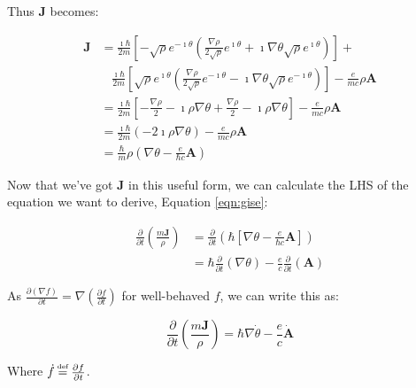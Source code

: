 Thus $\mathbf{J}$ becomes:

\begin{align}
    \mathbf{J} &= \frac{\imath \hbar}{2m} \left[ - \sqrt{\rho} e^{-\imath \theta}
    \left( \frac{\nabla \rho}{2 \sqrt{\rho}} e^{\imath \theta} + \imath \nabla \theta
    \sqrt{\rho} e^{\imath \theta} \right) \right] + \\
    & ~~~~ \frac{\imath \hbar}{2m} \left[ \sqrt{\rho} e^{\imath \theta} \left(
    \frac{\nabla \rho}{2 \sqrt{\rho}} e^{-\imath \theta} - \imath \nabla \theta \sqrt{\rho}
    e^{-\imath \theta} \right) \right] - \frac{e}{mc} \rho \mathbf{A} \\
    &= \frac{\imath \hbar}{2m} \left[ - \frac{\nabla \rho}{2} - \imath \rho
    \nabla \theta  + \frac{\nabla \rho}{2} - \imath \rho \nabla \theta \right] -
    \frac{e}{mc} \rho \mathbf{A} \\
    &= \frac{\imath \hbar}{2m} \left( - 2\imath \rho \nabla \theta \right) -
    \frac{e}{mc} \rho \mathbf{A} \\
    &= \frac{\hbar}{m} \rho \left( \nabla \theta - \frac{e}{\hbar c}
    \mathbf{A} \right)
    \label{eqn:j}
\end{align}

Now that we've got $\mathbf{J}$ in this useful form, we can calculate the LHS of
the equation we want to derive, Equation \ref{eqn:gise}:

\begin{align}
    \frac{\partial}{\partial t} \left( \frac{ m \mathbf{J}}{\rho} \right) &=
    \frac{\partial}{\partial t} \left( \hbar \left[ \nabla \theta -
    \frac{e}{\hbar c} \mathbf{A} \right] \right) \\
    &= \hbar \frac{\partial}{\partial t} \left( \nabla \theta \right) -
    \frac{e}{c} \frac{\partial}{\partial t} \left( \mathbf{A} \right)
\end{align}

As $\frac{\partial ( \nabla f )}{\partial t} = \nabla \left( \frac{\partial f}{\partial
t} \right)$ for well-behaved $f$, we can write this as:

\begin{equation}
    \frac{\partial}{\partial t} \left( \frac{m \mathbf{J}}{\rho} \right) = \hbar
    \nabla \dot \theta - \frac{e}{c} \mathbf{\dot A}
\end{equation}

Where $\dot f \defeq \frac{\partial f}{\partial t}$.
